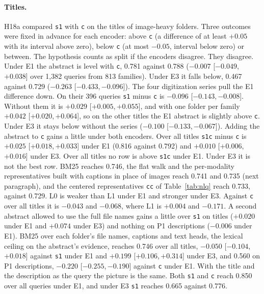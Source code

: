\documentclass[11pt]{article}
\newcommand{\rep}[1]{\texttt{#1}}
\newcommand{\ci}[2]{[\ensuremath{#1},\,\ensuremath{#2}]}  %
\begin{document}
\paragraph{Titles.} H18a compared \rep{s1} with \rep{c} on the titles of image-heavy folders. Three outcomes were fixed in advance for each encoder: above \rep{c} (a difference of at least $+0.05$ with its interval above zero), below \rep{c} (at most $-0.05$, interval below zero) or between. The hypothesis counts as split if the encoders disagree. They disagree. Under E1 the abstract is level with \rep{c}, 0.781 against 0.788 ($-0.007$ \ci{-0.049}{+0.038} over 1,382 queries from 813 families). Under E3 it falls below, 0.467 against 0.729 ($-0.263$ \ci{-0.433}{-0.096}). The four digitization series pull the E1 difference down. On their 396 queries \rep{s1} minus \rep{c} is $-0.096$ \ci{-0.143}{-0.008}. Without them it is $+0.029$ \ci{+0.005}{+0.055}, and with one folder per family $+0.042$ \ci{+0.020}{+0.064}, so on the other titles the E1 abstract is slightly above \rep{c}. Under E3 it stays below without the series ($-0.100$ \ci{-0.133}{-0.067}). Adding the abstract to \rep{c} gains a little under both encoders. Over all titles \rep{s1c} minus \rep{c} is $+0.025$ \ci{+0.018}{+0.033} under E1 (0.816 against 0.792) and $+0.010$ \ci{+0.006}{+0.016} under E3. Over all titles no row is above \rep{s1c} under E1. Under E3 it is not the best row. BM25 reaches 0.746, the flat walk and the per-modality representatives built with captions in place of images reach 0.741 and 0.735 (next paragraph), and the centered representatives \rep{cc} of Table~\ref{tab:nlq} reach 0.733, against 0.729. L0 is weaker than L1 under E1 and stronger under E3. Against \rep{c} over all titles it is $-0.043$ and $-0.068$, where L1 is $+0.004$ and $-0.171$. A second abstract allowed to use the full file names gains a little over \rep{s1} on titles ($+0.020$ under E1 and $+0.074$ under E3) and nothing on P1 descriptions ($-0.006$ under E1). BM25 over each folder's file names, captions and text heads, the lexical ceiling on the abstract's evidence, reaches 0.746 over all titles, $-0.050$ \ci{-0.104}{+0.018} against \rep{s1} under E1 and $+0.199$ \ci{+0.106}{+0.314} under E3, and 0.560 on P1 descriptions, $-0.220$ \ci{-0.255}{-0.190} against \rep{c} under E1. With the title and the description as the query the picture is the same. Both \rep{s1} and \rep{c} reach 0.850 over all queries under E1, and under E3 \rep{s1} reaches 0.665 against 0.776.
\end{document}
